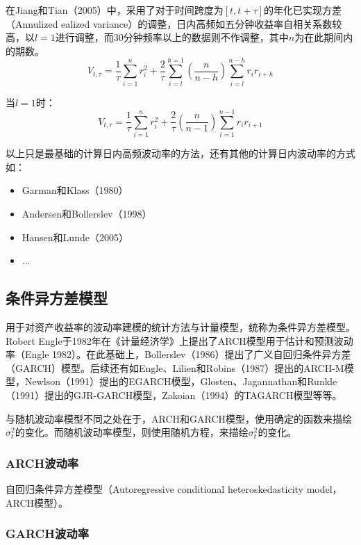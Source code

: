 \documentclass[11pt]{article}
\begin{document}
在Jiang和Tian（2005）中，采用了对于时间跨度为$[t,t+\tau]$的年化已实现方差（Annulized ealized variance）的调整，日内高频如五分钟收益率自相关系数较高，以$l=1$进行调整，而30分钟频率以上的数据则不作调整，其中$n$为在此期间内的期数。
\begin{equation*}
    V_{t,\tau} = \frac{1}{\tau}\sum_{i=1}^{n} r_i^2 + \frac{2}{\tau}\sum_{i=l}^{h=1}\left( \frac{n}{n-h} \right) \sum_{i=l}^{n-h} r_i r_{i+h}
\end{equation*}

当$l=1$时：
\begin{equation*}
    V_{t,\tau} = \frac{1}{\tau}\sum_{i=1}^{n} r_i^2 + \frac{2}{\tau} \left( \frac{n}{n-1} \right) \sum_{i=1}^{n-1} r_i r_{i+1}
\end{equation*}

以上只是最基础的计算日内高频波动率的方法，还有其他的计算日内波动率的方式如：
\begin{itemize}
    \item Garman和Klass（1980）
    \item Andersen和Bollerslev（1998）
    \item Hansen和Lunde（2005）
    \item ...
\end{itemize}

\subsection{条件异方差模型}

用于对资产收益率的波动率建模的统计方法与计量模型，统称为条件异方差模型。Robert Engle于1982年在《计量经济学》上提出了ARCH模型用于估计和预测波动率（Engle 1982）。在此基础上，Bollerslev（1986）提出了广义自回归条件异方差（GARCH）模型。后续还有如Engle、Lilien和Robins（1987）提出的ARCH-M模型，Newlson（1991）提出的EGARCH模型，Glosten、Jagannathan和Runkle（1991）提出的GJR-GARCH模型，Zakoian（1994）的TAGARCH模型等等。

与随机波动率模型不同之处在于，ARCH和GARCH模型，使用确定的函数来描绘$\sigma_{t}^{2}$的变化。而随机波动率模型，则使用随机方程，来描绘$\sigma_{t}^{2}$的变化。

\subsubsection{ARCH波动率}

自回归条件异方差模型（Autoregressive conditional heteroskedasticity model，ARCH模型）。
\subsubsection{GARCH波动率}
\end{document}
